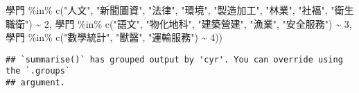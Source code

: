\documentclass[
]{article}
\newenvironment{Shaded}{\begin{snugshade}}{\end{snugshade}}
\newcommand{\DecValTok}[1]{\textcolor[rgb]{0.00,0.00,0.81}{#1}}
\newcommand{\FunctionTok}[1]{\textcolor[rgb]{0.00,0.00,0.00}{#1}}
\newcommand{\NormalTok}[1]{#1}
\newcommand{\SpecialCharTok}[1]{\textcolor[rgb]{0.00,0.00,0.00}{#1}}
\newcommand{\StringTok}[1]{\textcolor[rgb]{0.31,0.60,0.02}{#1}}
\begin{document}
\begin{Shaded}
\begin{Highlighting}[]
\NormalTok{                               學門 }\SpecialCharTok{\%in\%} \FunctionTok{c}\NormalTok{(}\StringTok{"人文"}\NormalTok{, }\StringTok{"新聞圖資"}\NormalTok{, }\StringTok{"法律"}\NormalTok{, }\StringTok{"環境"}\NormalTok{, }\StringTok{"製造加工"}\NormalTok{, }\StringTok{"林業"}\NormalTok{, }\StringTok{"社福"}\NormalTok{, }\StringTok{"衛生職衛"}\NormalTok{) }\SpecialCharTok{\textasciitilde{}} \DecValTok{2}\NormalTok{,}
\NormalTok{                               學門 }\SpecialCharTok{\%in\%} \FunctionTok{c}\NormalTok{(}\StringTok{"語文"}\NormalTok{, }\StringTok{"物化地科"}\NormalTok{, }\StringTok{"建築營建"}\NormalTok{, }\StringTok{"漁業"}\NormalTok{, }\StringTok{"安全服務"}\NormalTok{) }\SpecialCharTok{\textasciitilde{}} \DecValTok{3}\NormalTok{,}
\NormalTok{                               學門 }\SpecialCharTok{\%in\%} \FunctionTok{c}\NormalTok{(}\StringTok{"數學統計"}\NormalTok{, }\StringTok{"獸醫"}\NormalTok{, }\StringTok{"運輸服務"}\NormalTok{) }\SpecialCharTok{\textasciitilde{}} \DecValTok{4}\NormalTok{))}
\end{Highlighting}
\end{Shaded}

\begin{verbatim}
## `summarise()` has grouped output by 'cyr'. You can override using the `.groups`
## argument.
\end{verbatim}
\end{document}
